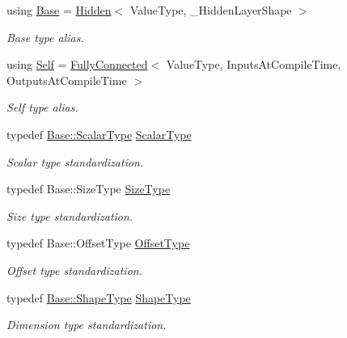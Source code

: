 \begin{DoxyCompactItemize}
\item 
using \hyperlink{classffnn_1_1layer_1_1_fully_connected_ad49d4e88823497be658d01c44eeef3f2}{Base} = \hyperlink{classffnn_1_1layer_1_1_hidden}{Hidden}$<$ Value\-Type, \-\_\-\-Hidden\-Layer\-Shape $>$
\begin{DoxyCompactList}\small\item\em Base type alias. \end{DoxyCompactList}\item 
using \hyperlink{classffnn_1_1layer_1_1_fully_connected_ac41b1867a1a4e8c9c9eaa892db2ab805}{Self} = \hyperlink{classffnn_1_1layer_1_1_fully_connected}{Fully\-Connected}$<$ Value\-Type, Inputs\-At\-Compile\-Time, Outputs\-At\-Compile\-Time $>$
\begin{DoxyCompactList}\small\item\em Self type alias. \end{DoxyCompactList}\item 
typedef \hyperlink{classffnn_1_1layer_1_1_layer_a3d482813f86f1ec69554b4592c478c32}{Base\-::\-Scalar\-Type} \hyperlink{classffnn_1_1layer_1_1_fully_connected_aa5e1875ec3ea63c90655419e7dd32a55}{Scalar\-Type}
\begin{DoxyCompactList}\small\item\em Scalar type standardization. \end{DoxyCompactList}\item 
typedef Base\-::\-Size\-Type \hyperlink{classffnn_1_1layer_1_1_fully_connected_a2924c85b3cc3e79db3f271cd22cac32c}{Size\-Type}
\begin{DoxyCompactList}\small\item\em Size type standardization. \end{DoxyCompactList}\item 
typedef Base\-::\-Offset\-Type \hyperlink{classffnn_1_1layer_1_1_fully_connected_a0f5ae1a0bd038f404410ce2af1054833}{Offset\-Type}
\begin{DoxyCompactList}\small\item\em Offset type standardization. \end{DoxyCompactList}\item 
typedef \hyperlink{classffnn_1_1layer_1_1_hidden_a567e902299b3355501393cf6c7b27c38}{Base\-::\-Shape\-Type} \hyperlink{classffnn_1_1layer_1_1_fully_connected_a938c80efb16baa531fb424626f339333}{Shape\-Type}
\begin{DoxyCompactList}\small\item\em Dimension type standardization. \end{DoxyCompactList}\item 

\end{DoxyCompactItemize}
